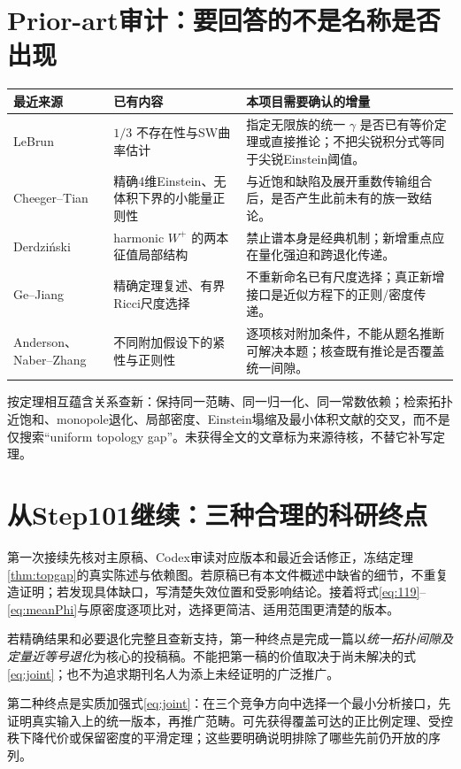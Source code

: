 \documentclass[UTF8,a4paper,11pt,fontset=fandol]{ctexart}
\numberwithin{equation}{section}
\theoremstyle{definition}
\begin{document}
\section{Prior-art审计：要回答的不是名称是否出现}
\begin{longtable}{L{.23\textwidth}L{.33\textwidth}L{.35\textwidth}}
\toprule 最近来源 & 已有内容 & 本项目需要确认的增量\\\midrule\endhead
LeBrun\cite{LeBrun2001} & $1/3$ 不存在性与SW曲率估计 & 指定无限族的统一 $\gamma$ 是否已有等价定理或直接推论；不把尖锐积分式等同于尖锐Einstein阈值。\\
Cheeger--Tian\cite{CT2006} & 精确4维Einstein、无体积下界的小能量正则性 & 与近饱和缺陷及展开重数传输组合后，是否产生此前未有的族一致结论。\\
Derdzi\'nski\cite{Derdzinski} & harmonic $W^+$ 的两本征值局部结构 & 禁止谱本身是经典机制；新增重点应在量化强迫和跨退化传递。\\
Ge--Jiang\cite{GJ2017} & 精确定理复述、有界Ricci尺度选择 & 不重新命名已有尺度选择；真正新增接口是近似方程下的正则/密度传递。\\
Anderson、Naber--Zhang\cite{Anderson1989,NZ} & 不同附加假设下的紧性与正则性 & 逐项核对附加条件，不能从题名推断可解决本题；核查既有推论是否覆盖统一间隙。\\\bottomrule
\end{longtable}
按定理相互蕴含关系查新：保持同一范畴、同一归一化、同一常数依赖；检索拓扑近饱和、monopole退化、局部密度、Einstein塌缩及最小体积文献的交叉，而不是仅搜索“uniform topology gap”。未获得全文的文章标为来源待核，不替它补写定理。

\section{从Step101继续：三种合理的科研终点}
第一次接续先核对主原稿、Codex审读对应版本和最近会话修正，冻结定理\ref{thm:topgap}的真实陈述与依赖图。若原稿已有本文件概述中缺省的细节，不重复造证明；若发现具体缺口，写清楚失效位置和受影响结论。接着将式\eqref{eq:119}--\eqref{eq:meanPhi}与原密度逐项比对，选择更简洁、适用范围更清楚的版本。

若精确结果和必要退化完整且查新支持，第一种终点是完成一篇以\emph{统一拓扑间隙及定量近等号退化}为核心的投稿稿。不能把第一稿的价值取决于尚未解决的式\eqref{eq:joint}；也不为追求期刊名人为添上未经证明的广泛推广。

第二种终点是实质加强式\eqref{eq:joint}：在三个竞争方向中选择一个最小分析接口，先证明真实输入上的统一版本，再推广范畴。可先获得覆盖可达的正比例定理、受控秩下降代价或保留密度的平滑定理；这些要明确说明排除了哪些先前仍开放的序列。
\end{document}
